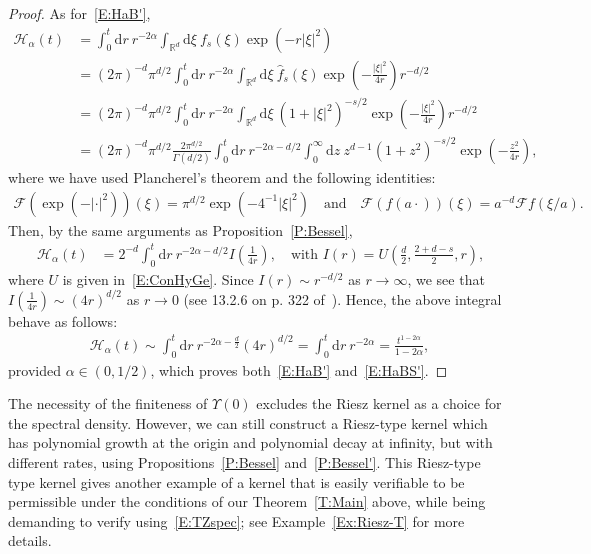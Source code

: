 \documentclass[a4paper,11pt]{article}%
\theoremstyle{plain}
\theoremstyle{definition}
\numberwithin{equation}{section}
\newcommand{\R}{\mathbb{R}}
\newcommand{\ud}{\ensuremath{\mathrm{d}}}
\begin{document}
\begin{proof}
  As for~\eqref{E:HaB'},
	\begin{align*}
        \mathcal{H}_\alpha(t)
    & = \int_{0}^t \ud r \: r^{-2\alpha} \int_{\R^d} \ud \xi \: f_{s}(\xi) \exp\left(-r|\xi|^2\right)                                                                 \\
    & = (2\pi)^{-d} \pi^{d/2} \int_{0}^t \ud r \: r^{-2\alpha} \int_{\R^d} \ud \xi \: \widehat{f}_{s}(\xi) \exp\left(-\frac{|\xi|^2}{4r}\right) r^{-d/2}              \\
    & = (2\pi)^{-d} \pi^{d/2} \int_{0}^t \ud r \: r^{-2\alpha} \int_{\R^d} \ud \xi \: \left(1 + |\xi|^2\right)^{-s / 2} \exp\left(-\frac{|\xi|^2}{4r}\right) r^{-d/2} \\
    & = (2\pi)^{-d} \pi^{d/2} \frac{2 \pi^{d/2}}{\Gamma\left(d/2\right)} \int_{0}^t \ud r \: r^{-2\alpha - d/2} \int_0^{\infty} \ud z \: z^{d-1} \left(1 + z^2\right)^{-s/2} \exp\left(-\frac{z^2}{4r}\right),
\end{align*}
  where we have used Plancherel's theorem and the following identities:
	\begin{align*}
    \mathcal{F}\left(\exp(-|\cdot|^2)\right)(\xi) = \pi^{d/2} \exp\left(-4^{-1}|\xi|^2\right) \quad \text{and} \quad
    \mathcal{F}(f(a\cdot))(\xi) = a^{-d}\mathcal{F}f(\xi / a).
	\end{align*}
  Then, by the same arguments as Proposition~\ref{P:Bessel},
	\begin{align*}
        \mathcal{H}_\alpha(t)
     & = 2^{-d} \int_{0}^t \ud r \: r^{-2\alpha - d/2} I\left(\frac{1}{4r}\right),
      \quad \text{with $I(r) = U\left(\frac{d}{2}, \frac{2+d-s}{2}, r\right)$,}
	\end{align*}
  where $U$ is given in~\eqref{E:ConHyGe}. Since $I(r) \sim r^{-d/2}$ as $r \to \infty$, we see that
  $I\left(\frac{1}{4r}\right) \sim (4r)^{d/2}$ as $r \to 0$ (see 13.2.6 on p. 322
  of~\cite{olver.lozier.ea:10:nist}). Hence, the above integral behave as follows:
	\begin{align*}
     \mathcal{H}_\alpha(t)
     \sim \int_{0}^t \ud r \: r^{-2\alpha - \frac{d}{2}} (4r)^{d/2}
     = \int_{0}^t \ud r \: r^{-2\alpha}
     = \frac{t^{1-2\alpha}}{1-2\alpha},
	\end{align*}
  provided $\alpha \in (0, 1/2)$, which proves both~\eqref{E:HaB'} and~\eqref{E:HaBS'}.
\end{proof}


The necessity of the finiteness of $\Upsilon(0)$ excludes the Riesz kernel as a choice for the
spectral density. However, we can still construct a Riesz-type kernel which has polynomial growth at
the origin and polynomial decay at infinity, but with different rates, using
Propositions~\ref{P:Bessel} and~\ref{P:Bessel'}. This Riesz-type type kernel gives another example
of a kernel that is easily verifiable to be permissible under the conditions of our
Theorem~\ref{T:Main} above, while being demanding to verify using~\eqref{E:TZspec}; see
Example~\ref{Ex:Riesz-T} for more details.
\end{document}
